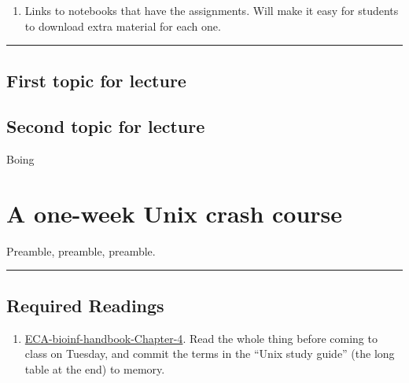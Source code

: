 \documentclass[]{book}
\providecommand{\tightlist}{%
  \setlength{\itemsep}{0pt}\setlength{\parskip}{0pt}}
\begin{document}
\begin{enumerate}
\def\labelenumi{\arabic{enumi}.}
\tightlist
\item
  Links to notebooks that have the assignments. Will make it
  easy for students to download extra material for each one.
\end{enumerate}

\begin{center}\rule{0.5\linewidth}{\linethickness}\end{center}

\hypertarget{first-topic-for-lecture}{%
\section{First topic for lecture}\label{first-topic-for-lecture}}

\hypertarget{second-topic-for-lecture}{%
\section{Second topic for lecture}\label{second-topic-for-lecture}}

Boing

\hypertarget{a-one-week-unix-crash-course}{%
\chapter{A one-week Unix crash course}\label{a-one-week-unix-crash-course}}

Preamble, preamble, preamble.

\begin{center}\rule{0.5\linewidth}{\linethickness}\end{center}

\hypertarget{required-readings-1}{%
\section*{Required Readings}\label{required-readings-1}}

\begin{enumerate}
\def\labelenumi{\arabic{enumi}.}
\tightlist
\item
  \href{https://eriqande.github.io/eca-bioinf-handbook/essential-unixlinux-terminal-knowledge.html}{ECA-bioinf-handbook-Chapter-4}. Read the whole
  thing before coming to class on Tuesday, and commit the terms in the ``Unix study guide'' (the long table at the end) to memory.
\end{enumerate}
\end{document}
